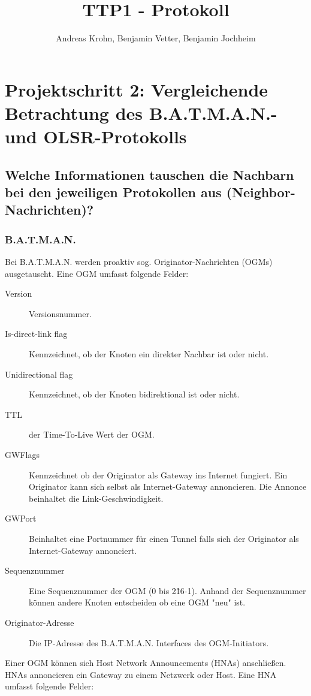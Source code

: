 \documentclass[a4paper,10pt]{article}
\title{TTP1 - Protokoll}
\author{Andreas Krohn, Benjamin Vetter, Benjamin Jochheim}
\begin{document}
\maketitle

\section{Projektschritt 2: Vergleichende Betrachtung des B.A.T.M.A.N.- und OLSR-Protokolls}

\subsection{Welche Informationen tauschen die Nachbarn bei den jeweiligen Protokollen aus (Neighbor-Nachrichten)?}


\subsubsection*{B.A.T.M.A.N.}

Bei B.A.T.M.A.N. werden proaktiv sog. Originator-Nachrichten (OGMs) ausgetauscht.
Eine OGM umfasst folgende Felder: 

\begin{description}
  \item[Version] Versionsnummer.
  \item[Is-direct-link flag] Kennzeichnet, ob der Knoten ein direkter Nachbar ist oder nicht.
  \item[Unidirectional flag] Kennzeichnet, ob der Knoten bidirektional ist oder nicht.
  \item[TTL] der Time-To-Live Wert der OGM.
  \item[GWFlags] Kennzeichnet ob der Originator als Gateway ins Internet fungiert. Ein Originator kann sich selbst als Internet-Gateway annoncieren. Die Annonce beinhaltet die Link-Geschwindigkeit.
  \item[GWPort] Beinhaltet eine Portnummer für einen Tunnel falls sich der Originator als Internet-Gateway annonciert.
  \item[Sequenznummer] Eine Sequenznummer der OGM (0 bis 2\^16-1). Anhand der Sequenznummer können andere Knoten entscheiden ob eine OGM "neu" ist.
  \item[Originator-Adresse] Die IP-Adresse des B.A.T.M.A.N. Interfaces des OGM-Initiators.
\end{description}

Einer OGM können sich Host Network Announcements (HNAs) anschließen. 
HNAs annoncieren ein Gateway zu einem Netzwerk oder Host.
Eine HNA umfasst folgende Felder: 
\end{document}
